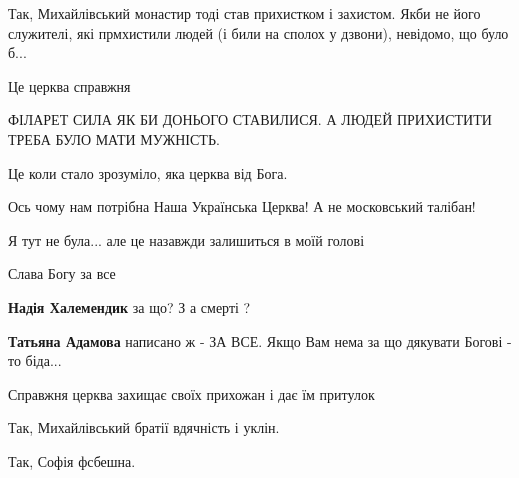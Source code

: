  
 
 
 
 


Так, Михайлівський монастир тоді став прихистком і захистом. Якби не його
служителі, які прмхистили людей (і били на сполох у дзвони), невідомо, що було
б...


Це церква справжня

ФІЛАРЕТ СИЛА ЯК БИ ДОНЬОГО СТАВИЛИСЯ. А ЛЮДЕЙ ПРИХИСТИТИ ТРЕБА БУЛО МАТИ МУЖНІСТЬ.

Це коли стало зрозуміло, яка церква від Бога.

Ось чому нам потрібна Наша Українська Церква! А не московський талібан!

Я тут не була... але це назавжди залишиться в моїй голові

Слава Богу за все

\begin{itemize} %
\textbf{Надія Халемендик} за що? З а смерті ?

\textbf{Татьяна Адамова} написано ж - ЗА ВСЕ. Якщо Вам нема за що дякувати Богові - то біда...
\end{itemize} %

Справжня церква захищає своїх прихожан і дає їм притулок

Так, Михайлівський братії вдячність і уклін.

Так, Софія фсбешна.

